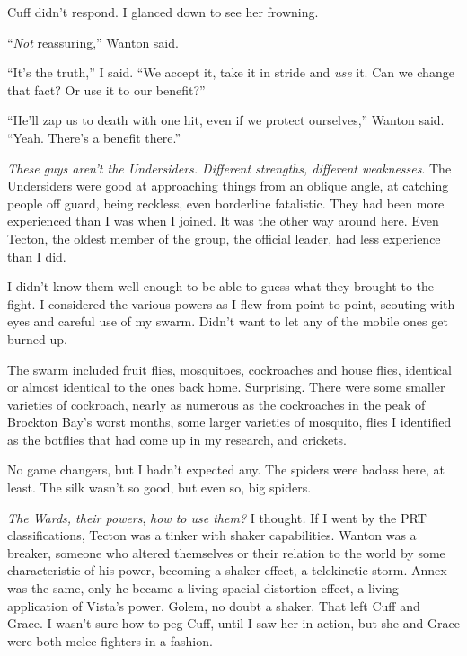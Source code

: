 Cuff didn't respond.  I glanced down to see her frowning.



``\emph{Not} reassuring,'' Wanton said.



``It's the truth,'' I said.  ``We accept it, take it in stride and \emph{use} it.  Can we change that fact?  Or use it to our benefit?''



``He'll zap us to death with one hit, even if we protect ourselves,'' Wanton said.  ``Yeah.  There's a benefit there.''



\emph{These guys aren't the Undersiders.  Different strengths, different weaknesses}.  The Undersiders were good at approaching things from an oblique angle, at catching people off guard, being reckless, even borderline fatalistic.  They had been more experienced than I was when I joined.  It was the other way around here.  Even Tecton, the oldest member of the group, the official leader, had less experience than I did.



I didn't know them well enough to be able to guess what they brought to the fight.  I considered the various powers as I flew from point to point, scouting with eyes and careful use of my swarm.  Didn't want to let any of the mobile ones get burned up.



The swarm included fruit flies, mosquitoes, cockroaches and house flies, identical or almost identical to the ones back home.  Surprising.  There were some smaller varieties of cockroach, nearly as numerous as the cockroaches in the peak of Brockton Bay's worst months, some larger varieties of mosquito, flies I identified as the botflies that had come up in my research, and crickets.



No game changers, but I hadn't expected any.  The spiders were badass here, at least.  The silk wasn't so good, but even so, big spiders.



\emph{The Wards, their powers}, \emph{how to use them?  }I thought\emph{.} If I went by the PRT classifications, Tecton was a tinker with shaker capabilities.  Wanton was a breaker, someone who altered themselves or their relation to the world by some characteristic of his power, becoming a shaker effect, a telekinetic storm.  Annex was the same, only he became a living spacial distortion effect, a living application of Vista's power.  Golem, no doubt a shaker.  That left Cuff and Grace.  I wasn't sure how to peg Cuff, until I saw her in action, but she and Grace were both melee fighters in a fashion.



